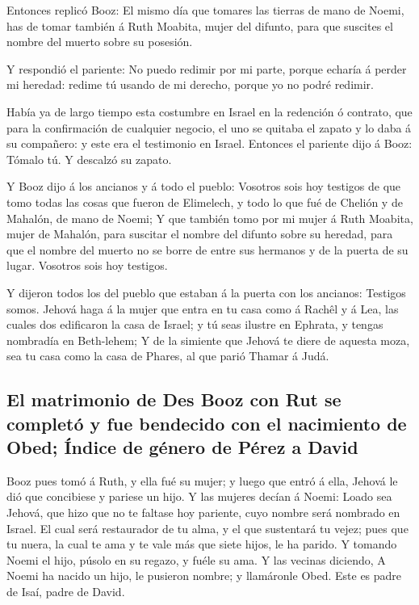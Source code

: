  Entonces replicó Booz: El mismo día que tomares las
tierras de mano de Noemi, has de tomar también á Ruth Moabita, mujer del
difunto, para que suscites el nombre del muerto sobre su posesión.

 Y respondió el pariente: No puedo redimir por mi parte,
porque echaría á perder mi heredad: redime tú usando de mi derecho,
porque yo no podré redimir.

 Había ya de largo tiempo esta costumbre en Israel en la
redención ó contrato, que para la confirmación de cualquier negocio, el
uno se quitaba el zapato y lo daba á su compañero: y este era el
testimonio en Israel.  Entonces el pariente dijo á Booz:
Tómalo tú. Y descalzó su zapato.

 Y Booz dijo á los ancianos y á todo el pueblo: Vosotros
sois hoy testigos de que tomo todas las cosas que fueron de Elimelech, y
todo lo que fué de Chelión y de Mahalón, de mano de Noemi;
 Y que también tomo por mi mujer á Ruth Moabita, mujer de
Mahalón, para suscitar el nombre del difunto sobre su heredad, para que
el nombre del muerto no se borre de entre sus hermanos y de la puerta de
su lugar. Vosotros sois hoy testigos.

 Y dijeron todos los del pueblo que estaban á la puerta
con los ancianos: Testigos somos. Jehová haga á la mujer que entra en tu
casa como á Rachêl y á Lea, las cuales dos edificaron la casa de Israel;
y tú seas ilustre en Ephrata, y tengas nombradía en Beth-lehem;
 Y de la simiente que Jehová te diere de aquesta moza,
sea tu casa como la casa de Phares, al que parió Thamar á Judá.

\hypertarget{el-matrimonio-de-des-booz-con-rut-se-completuxf3-y-fue-bendecido-con-el-nacimiento-de-obed-uxedndice-de-guxe9nero-de-puxe9rez-a-david}{%
\subsection{El matrimonio de Des Booz con Rut se completó y fue
bendecido con el nacimiento de Obed; Índice de género de Pérez a
David}\label{el-matrimonio-de-des-booz-con-rut-se-completuxf3-y-fue-bendecido-con-el-nacimiento-de-obed-uxedndice-de-guxe9nero-de-puxe9rez-a-david}}

 Booz pues tomó á Ruth, y ella fué su mujer; y luego que
entró á ella, Jehová le dió que concibiese y pariese un hijo.
 Y las mujeres decían á Noemi: Loado sea Jehová, que hizo
que no te faltase hoy pariente, cuyo nombre será nombrado en Israel.
 El cual será restaurador de tu alma, y el que sustentará
tu vejez; pues que tu nuera, la cual te ama y te vale más que siete
hijos, le ha parido.  Y tomando Noemi el hijo, púsolo en
su regazo, y fuéle su ama.  Y las vecinas diciendo, A
Noemi ha nacido un hijo, le pusieron nombre; y llamáronle Obed. Este es
padre de Isaí, padre de David.


